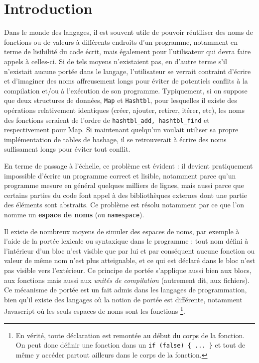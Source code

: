 \documentclass[11pt,a4paper]{report}
\begin{document}
\chapter{Introduction}

Dans le monde des langages, il est souvent utile de pouvoir réutiliser des noms
de fonctions ou de valeurs à différents endroits d'un programme, notamment en
terme de lisibilité du code écrit, mais également pour l'utilisateur qui devra
faire appels à celles-ci. Si de tels moyens n'existaient pas, en d'autre terme
s'il n'existait aucune portée dans le langage, l'utilisateur se verrait
contraint d'écrire et d'imaginer des noms affreusement longs pour éviter de
potentiels conflits à la compilation et/ou à l'exécution de son
programme. Typiquement, si on suppose que deux structures de données,
\texttt{Map} et \texttt{Hashtbl}, pour lesquelles il existe des opérations
relativement identiques (créer, ajouter, retirer, itérer, etc), les noms des
fonctions seraient de l'ordre de \texttt{hashtbl\_add, hashtbl\_find} et
respectivement pour Map. Si maintenant quelqu'un voulait utiliser sa propre
implémentation de tables de hashage, il se retrouverait à écrire des noms
suffisament longs pour éviter tout conflit.

En terme de passage à l'échelle, ce problème est évident : il devient
pratiquement impossible d'écrire un programme correct et lisible, notamment
parce qu'un programme mesure en général quelques milliers de lignes, mais aussi
parce que certains parties du code font appel à des bibliothèques externes dont
une partie des éléments sont abstraits. Ce problème est résolu notamment par ce
que l'on nomme un \textbf{espace de noms} (ou \texttt{namespace}).

Il existe de nombreux moyens de simuler des espaces de noms, par exemple à
l'aide de la portée lexicale ou syntaxique dans le programme : tout nom défini à
l'intérieur d'un bloc n'est visible que par lui et par conséquent aucune
fonction ou valeur de même nom n'est plus atteignable, et ce qui est déclaré
dans le bloc n'est pas visible vers l'extérieur. Ce principe de portée
s'applique aussi bien aux blocs, aux fonctions mais aussi aux \emph{unités de
  compilation} (autrement dit, aux fichiers). Ce mécanisme de portée est un fait
admis dans les langages de programmation, bien qu'il existe des langages où la
notion de portée est différente, notamment Javascript où les seuls espaces de
noms sont les fonctions \cite{EcmaScript}\footnote{En vérité, toute déclaration
  est remontée au début du corps de la fonction. On peut donc définir une
  fonction dans un \texttt{if (false) \{ ... \}} et tout de même y accéder
  partout ailleurs dans le corps de la fonction.}.
\end{document}
